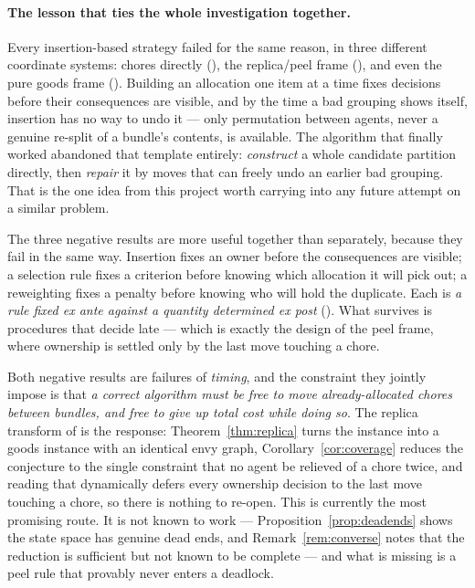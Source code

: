 \paragraph{The lesson that ties the whole investigation together.}
Every insertion-based strategy failed for the same reason, in three different
coordinate systems: chores directly (), the replica/peel
frame (), and even the pure goods frame
(). Building an allocation one item at a time
fixes decisions before their consequences are visible, and by the time a bad
grouping shows itself, insertion has no way to undo it --- only permutation
between agents, never a genuine re-split of a bundle's contents, is available.
The algorithm that finally worked abandoned that template entirely:
\emph{construct} a whole candidate partition directly, then \emph{repair} it by
moves that can freely undo an earlier bad grouping. That is the one idea from
this project worth carrying into any future attempt on a similar problem.

The three negative results are more useful together than separately, because
they fail in the same way. Insertion fixes an owner before the consequences are
visible; a selection rule fixes a criterion before knowing which allocation it
will pick out; a reweighting fixes a penalty before knowing who will hold the
duplicate. Each is \emph{a rule fixed ex ante against a quantity determined ex
post} (). What survives is procedures that decide late ---
which is exactly the design of the peel frame, where ownership is settled only
by the last move touching a chore.

Both negative results are failures of \emph{timing}, and the constraint they
jointly impose is that \emph{a correct algorithm must be free to move
already-allocated chores between bundles, and free to give up total cost while
doing so}. The replica transform of  is the response:
Theorem~\ref{thm:replica} turns the instance into a goods instance with an
identical envy graph, Corollary~\ref{cor:coverage} reduces the conjecture to the
single constraint that no agent be relieved of a chore twice, and reading that
dynamically defers every ownership decision to the last move touching a chore,
so there is nothing to re-open. This is currently the most promising route.
It is not known to work --- Proposition~\ref{prop:deadends} shows the state
space has genuine dead ends, and Remark~\ref{rem:converse} notes that the
reduction is sufficient but not known to be complete --- and what is missing is
a peel rule that provably never enters a deadlock.

